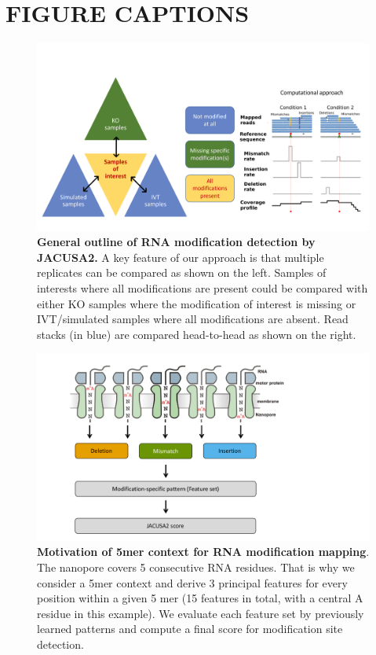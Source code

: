 \documentclass[times, 11pt, a4paper]{article}
\begin{document}
 

\newpage

\section*{FIGURE CAPTIONS}

\begin{figure}[h!]
    \includegraphics[width = 1\textwidth]{Figure1.pdf}
  \caption{\textbf{General outline of RNA modification detection by JACUSA2.} A key feature of our approach is that multiple replicates can be compared as shown on the left. Samples of interests where all modifications are present could be compared with either KO samples where the modification of interest is missing or IVT/simulated samples where all modifications are absent. Read stacks (in blue) are compared head-to-head as shown on the right. }
  \label{fig:graphicsummary}
      \end{figure}
\newpage

\begin{figure}[h!]
    \includegraphics[width = 1\textwidth]{Figure2.pdf}
  \caption{\textbf{Motivation of 5mer context for RNA modification mapping}. The nanopore covers 5 consecutive RNA residues. That is why we consider a 5mer context and derive 3 principal features for every position within a given 5 mer (15 features in total, with a central A residue in this example). We evaluate each feature set by previously learned patterns and compute a final score for modification site detection.}
  \label{fig:5mer}
      \end{figure}
\newpage
\end{document}
